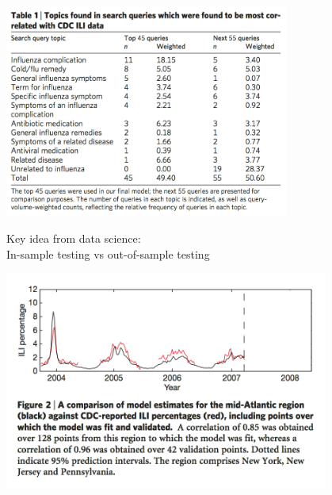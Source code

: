 \documentclass[aspectratio=169]{beamer}
\begin{document}
\begin{frame}

\begin{center}
\includegraphics[width=0.7\textwidth]{figures/ginsberg_detecting_2009_tab1}
\end{center}

\end{frame}
\begin{frame}

Key idea from data science:\\
In-sample testing vs out-of-sample testing

\end{frame}
\begin{frame}

\begin{center}
\includegraphics[width=0.8\textwidth]{figures/ginsberg_detecting_2009_fig2_insample}
\end{center}

\end{frame}
\end{document}

